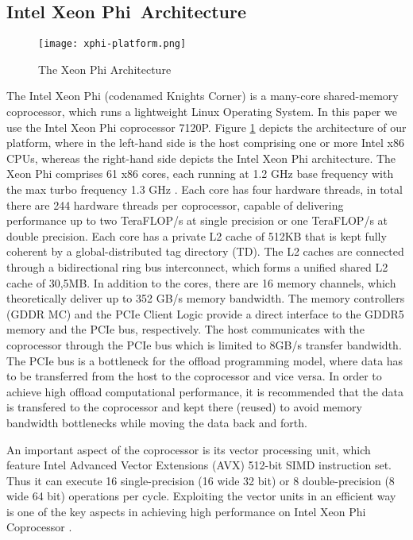 \documentclass[conference]{IEEEtran}
\begin{document}
\subsection{Intel\textsuperscript{\textregistered} Xeon Phi\texttrademark ~Architecture}


\begin{figure}[!ht]
	\centering
	\texttt{[image: xphi-platform.png]}
	\caption{The Xeon Phi Architecture}
	\label{fig:xphi-platform}
	\vspace{-10pt}
\end{figure}

The Intel Xeon Phi (codenamed Knights Corner) is a many-core shared-memory coprocessor, which runs a lightweight Linux Operating System. In this paper we use the Intel Xeon Phi coprocessor 7120P. Figure \ref{fig:xphi-platform} depicts the architecture of our platform, where in the left-hand side is the host comprising one or more Intel x86 CPUs, whereas the right-hand side depicts the Intel Xeon Phi architecture. The Xeon Phi comprises 61 x86 cores, each running at 1.2 GHz base frequency with the max turbo frequency 1.3 GHz \cite{chrysos2014intel}. Each core has four hardware threads, in total there are 244 hardware threads per coprocessor, capable of delivering performance up to two TeraFLOP/s at single precision or one TeraFLOP/s at double precision. Each core has a private L2 cache of 512KB that is kept fully coherent by a global-distributed tag directory (TD). The L2 caches are connected through a bidirectional ring bus interconnect, which forms a unified shared L2 cache of 30,5MB. In addition to the cores, there are 16 memory channels, which theoretically deliver up to 352 GB/s memory bandwidth. The memory controllers (GDDR MC) and the PCIe Client Logic provide a direct interface to the GDDR5 memory and the PCIe bus, respectively. The host communicates with the coprocessor through the PCIe bus which is limited to 8GB/s transfer bandwidth. The PCIe bus is a bottleneck for the offload programming model, where data has to be transferred from the host to the coprocessor and vice versa. In order to achieve high offload computational performance, it is recommended that the data is transfered to the coprocessor and kept there (reused) to avoid memory bandwidth bottlenecks while moving the data back and forth.

An important aspect of the coprocessor is its vector processing unit, which feature Intel Advanced Vector Extensions (AVX) 512-bit SIMD instruction set. Thus it can execute 16 single-precision (16 wide  32 bit) or 8 double-precision (8 wide  64 bit) operations per cycle. Exploiting the vector units in an efficient way is one of the key aspects in achieving high performance on Intel Xeon Phi Coprocessor \cite{TianSPGKMCP13}. 
\end{document}
